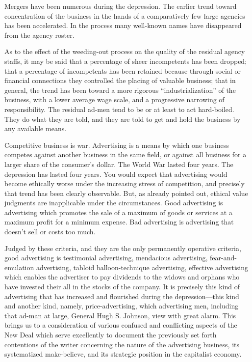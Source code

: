 \documentclass[twoside,nohyper,openany,nobib]{tufte-book}
\begin{document}
Mergers have been numerous during the depression. The earlier trend
toward concentration of the business in the hands of a comparatively few
large agencies has been accelerated. In the process many well-known
names have disappeared from the agency roster.

As to the effect of the weeding-out process on the quality of the
residual agency staffs, it may be said that a percentage of sheer
incompetents has been dropped; that a percentage of incompetents has
been retained because through social or financial connections they
controlled the placing of valuable business; that in general, the trend
has been toward a more rigorous ``industrialization'' of the business,
with a lower average wage scale, and a progressive narrowing of
responsibility. The residual ad-men tend to be or at least to act
hard-boiled. They do what they are told, and they are told to get and
hold the business by any available means.

Competitive business is war. Advertising is a means by which one
business competes against another business in the same field, or against
all business for a larger share of the consumer's dollar. The World War
lasted four years. The depression has lasted four years. You would
expect that advertising would become ethically worse under the
increasing stress of competition, and precisely that trend has been
clearly observable. But, as already pointed out, ethical value judgments
are inapplicable under the circumstances. Good advertising is
advertising which promotes the sale of a maximum of goods or services at
a maximum profit for a minimum expense. Bad advertising is advertising
that doesn't sell or costs too much.

Judged by these criteria, and they are the only permanently operative
criteria, good advertising is testimonial advertising, mendacious
advertising, fear-and-emulation advertising, tabloid balloon-technique
advertising, effective advertising which enables the advertiser to pay
dividends to the widows and orphans who have invested their all in the
stocks of the company. It is precisely this kind of advertising that has
increased and flourished during the depression---this kind and another
kind, namely, price-advertising, which advertising men, including that
ad-man at large, General Hugh S. Johnson, view with great alarm. This
brings us to a consideration of various confused and conflicting aspects
of the New Deal which serve excellently to document the previously set
forth contentions of the writer concerning the nature of the advertising
business, its systematized make-believe, and its strategic position in
the capitalist economy.
\end{document}
